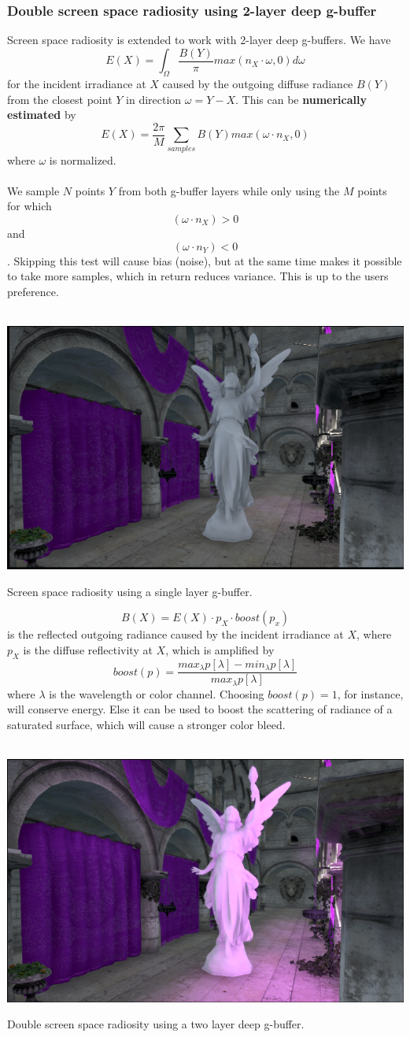 \documentclass{ACGSeminar}
\begin{document}
	\subsubsection{Double screen space radiosity using 2-layer deep g-buffer}
		Screen space radiosity \cite{RTAII} is extended to work with 2-layer deep g-buffers. We have 
		$$ E(X) = \int_{\Omega} \frac{B(Y)}{\pi} max(n_X \cdot \omega, 0) d\omega$$
		for the incident irradiance at $X$ caused by the outgoing diffuse radiance $B(Y)$ from the closest point $Y$ in direction $\omega = Y - X$. This can be \textbf{numerically estimated} by
		$$ E(X) = \frac{2\pi}{M} \sum_{samples} B(Y) max(\omega \cdot n_X, 0)$$
		where $\omega$ is normalized. \\\\
		We sample $N$ points $Y$ from both g-buffer layers while only using the $M$ points for which
		$$ (\omega \cdot n_X) > 0 $$
		and
		$$ (\omega \cdot n_Y) < 0 $$. Skipping this test will cause bias (noise), but at the same time makes it possible to take more samples, which in return reduces variance. This is up to the users preference. \\\\
		\begin{floatingfigure}[r]{.5\textwidth}%
			\includegraphics[width=.5\textwidth]{img/radiosity_one.png}
			\caption{Screen space radiosity using a single layer g-buffer.}%
			\label{fig:radiosity_one}%
		\end{floatingfigure}%
		$$ B(X) = E(X) \cdot p_X \cdot boost(p_x) $$
		is the reflected outgoing radiance caused by the incident irradiance at $X$, where $p_X$ is the diffuse reflectivity at $X$, which is amplified by 
		$$ boost(p) = \frac{max_{\lambda}p[\lambda] - min_{\lambda}p[\lambda]}{max_{\lambda}p[\lambda]} $$ 
		where $\lambda$ is the wavelength or color channel. Choosing $boost(p) = 1$, for instance, will conserve energy. Else it can be used to boost the scattering of radiance of a saturated surface, which will cause a stronger color bleed. \\\\
		\begin{floatingfigure}[r]{.5\textwidth}%
			\includegraphics[width=.5\textwidth]{img/radiosity_two.png}
			\caption{Double screen space radiosity using a two layer deep g-buffer.}%
			\label{fig:radiosity_two}%
		\end{floatingfigure}%
\end{document}
